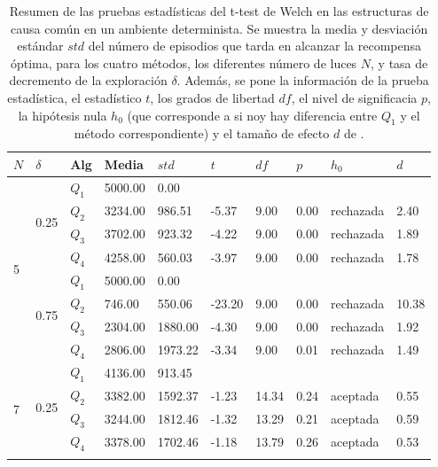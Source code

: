 \begin{table}[]
\centering
\caption{Resumen de las pruebas estadísticas del t-test de Welch en las
estructuras de causa común en un ambiente determinista. Se muestra la media y desviación estándar $std$ del número 
de episodios que tarda en alcanzar la recompensa óptima, para los cuatro métodos, los diferentes número de luces $N$, y tasa de decremento de la exploración $\delta$. Además, se pone la información
de la prueba estadística, el estadístico $t$, los grados de libertad $df$, el nivel
de significacia $p$, la hipótesis nula $h_0$ (que corresponde a si noy hay diferencia entre $Q_1$ y el método correspondiente) y el tamaño de efecto $d$ de \citet{cohen2013statistical}.}
\label{tab:common-cause-delta-det}
\begin{tabular}{|l|l|l|l|l|l|l|l|l|l|}
\hline
$N$ & $\delta$ & Alg & Media & $std$ & $t$ & $df$ & $p$ & $h_0$ & $d$ \\ \hline
\multirow{8}{*}{5} & \multirow{4}{*}{0.25} & $Q_1$ & 5000.00 & 0.00 & \multicolumn{5}{l|}{} \\ \cline{3-10} 
 &  & $Q_2$ & 3234.00 & 986.51 & -5.37 & 9.00 & 0.00 & rechazada & 2.40 \\ \cline{3-10} 
 &  & $Q_3$ & 3702.00 & 923.32 & -4.22 & 9.00 & 0.00 & rechazada & 1.89 \\ \cline{3-10} 
 &  & $Q_4$ & 4258.00 & 560.03 & -3.97 & 9.00 & 0.00 & rechazada & 1.78 \\ \cline{2-10} 
 & \multirow{4}{*}{0.75} & $Q_1$ & 5000.00 & 0.00 & \multicolumn{5}{l|}{} \\ \cline{3-10} 
 &  & $Q_2$ & 746.00 & 550.06 & -23.20 & 9.00 & 0.00 & rechazada & 10.38 \\ \cline{3-10} 
 &  & $Q_3$ & 2304.00 & 1880.00 & -4.30 & 9.00 & 0.00 & rechazada & 1.92 \\ \cline{3-10} 
 &  & $Q_4$ & 2806.00 & 1973.22 & -3.34 & 9.00 & 0.01 & rechazada & 1.49 \\ \hline
\multirow{8}{*}{7} & \multirow{4}{*}{0.25} & $Q_1$ & 4136.00 & 913.45 & \multicolumn{5}{l|}{} \\ \cline{3-10} 
 &  & $Q_2$ & 3382.00 & 1592.37 & -1.23 & 14.34 & 0.24 & aceptada & 0.55 \\ \cline{3-10} 
 &  & $Q_3$ & 3244.00 & 1812.46 & -1.32 & 13.29 & 0.21 & aceptada & 0.59 \\ \cline{3-10} 
 &  & $Q_4$ & 3378.00 & 1702.46 & -1.18 & 13.79 & 0.26 & aceptada & 0.53 \\ \cline{2-10} 

\end{tabular}
\end{table}
